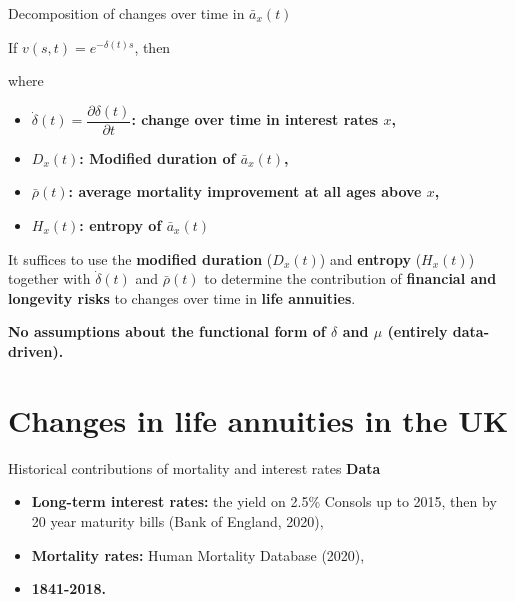 \documentclass[10pt]{beamer}
\begin{document}
\begin{frame}{Decomposition of changes over time in $\bar{a}_x(t)$}


If $v(s,t)=e^{-\delta(t)s}$, then 


\begin{center}
	\pause
\end{center}

where

\begin{itemize}
	
	\item $\dot{\delta}(t)=\dfrac{\partial \delta(t)}{\partial t}$\textbf{: change over time in interest rates $x$,} \pause
	\item ${D}_x(t)$\textbf{: Modified duration of $\bar{a}_x(t)$,}	\pause
	\item $\bar{\rho}(t)$\textbf{: average mortality improvement at all ages above $x$,} 
	\item ${H}_x(t)$\textbf{: entropy of $\bar{a}_x(t)$} \pause
\end{itemize}

It suffices to use the \textbf{modified duration} ($D_x(t)$) and \textbf{entropy} (${H}_x(t)$) together with $\dot{\delta}(t)$ and $\bar{\rho}(t)$ to determine the contribution of \textbf{financial and longevity risks} to changes over time in \textbf{life annuities}. \pause

\textbf{No assumptions about the functional form of $\delta$ and $\mu$ (entirely data-driven).}
\end{frame}







\section{Changes in life annuities in the UK}


\begin{frame}{Historical contributions of mortality and interest rates}
\textbf{Data}
\begin{itemize}
	\item \textbf{Long-term interest rates:} the yield on 2.5\% Consols up to 2015, then by 20 year maturity bills (Bank of England, 2020), \pause
	\item \textbf{Mortality rates: } Human Mortality Database (2020), \pause
	\item \textbf{1841-2018.}
\end{itemize}


\end{frame}
\end{document}
